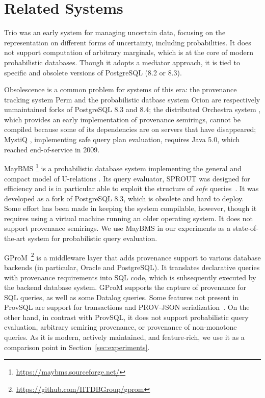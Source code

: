 \section{Related Systems} \label{sec:related}
Trio \cite{dblp:conf/vldb/agrawalbshnsw06} was an early system for
managing uncertain data, focusing on the representation on different
forms of uncertainty, including probabilities. It
does not support computation of arbitrary marginals, which is at the core
of modern probabilistic databases. Though it adopts a mediator approach,
it is tied to specific and obsolete versions of PostgreSQL (8.2 or 8.3).

Obsolescence is a common problem for systems of this era: the provenance
tracking system Perm \cite{DBLP:conf/icde/GlavicA09} and the
probabilistic datbase system Orion \cite{singh2008orion} are respectively
unmaintained forks of PostgreSQL 8.3 and 8.4; the distributed Orchestra
system
\cite{DBLP:conf/sigmod/GreenKTBIT07}, which provides
an early implementation of provenance semirings, cannot be compiled because
some of its dependencies are on servers that have disappeared; MystiQ
\cite{DBLP:conf/sigmod/BoulosDMMRS05}, implementing safe query
plan evaluation, requires Java 5.0, which reached end-of-service in
2009.

MayBMS
\cite{huang2009maybms}\footnote{\url{https://maybms.sourceforge.net/}} is a probabilistic database system
implementing the general and compact model of U-relations
\cite{DBLP:conf/icde/AntovaJKO08}. Its query evaluator, SPROUT
\cite{DBLP:conf/icde/OlteanuHK09} was designed for efficiency and is in
particular able to exploit the structure of \emph{safe}
queries~\cite{dalvi2013dichotomy}. It was developed as a fork of
PostgreSQL 8.3, which is obsolete and hard to deploy. Some
effort has been made in keeping the system compilable, however, though it
requires using a virtual machine running an older operating system. It
does not support provenance semirings. We
use MayBMS in our experiments as a state-of-the-art system for
probabilistic query evaluation.

GProM~\cite{bahareh2018gprom}\footnote{\url{https://github.com/IITDBGroup/gprom}}
is a middleware layer that adds provenance support to various
database backends (in particular, Oracle and PostgreSQL). It translates
declarative queries with provenance requirements into SQL code, which is
subsequently executed by the backend database system. GProM supports the
capture of provenance for SQL queries, as well as some Datalog queries.
Some features not present in ProvSQL are support for
transactions and PROV-JSON serialization~\cite{provjson}. On the other
hand, in contrast with ProvSQL, it does not support probabilistic query
evaluation, arbitrary semiring provenance, or provenance of
non-monotone queries. As it is modern, actively maintained, and
feature-rich, we use it as a comparison point in
Section~\ref{sec:experiments}.

